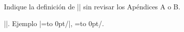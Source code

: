


\bigskip

\enunciadoS Indique la definici\'on de |\llap| sin revisar los
Ap\'endices A o B.

\bigskip

\def\myllap#1{\hbox to 0pt{\hss#1}}
\respuestaS |\def\myllap#1{\hbox to 0pt{\hss#1}}|. Ejemplo
|=\myllap/|, =\myllap/.

\bye

